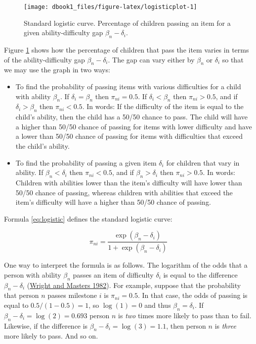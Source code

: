 \documentclass[
]{book}
\providecommand{\tightlist}{%
  \setlength{\itemsep}{0pt}\setlength{\parskip}{0pt}}
\begin{document}
\begin{figure}

{\centering \texttt{[image: dbook1\_files/figure-latex/logisticplot-1]} 

}

\caption{Standard logistic curve. Percentage of children passing an item for a given ability-difficulty gap \(\beta_n - \delta_i\).}\label{fig:logisticplot}
\end{figure}



Figure \ref{fig:logisticplot} shows how the percentage of children that pass the item varies in terms of the ability-difficulty gap \(\beta_n - \delta_i\). The gap can vary either by \(\beta_n\) or \(\delta_i\) so that we may use the graph in two ways:

\begin{itemize}
\tightlist
\item
  To find the probability of passing items with various difficulties for a child with ability \(\beta_n\). If \(\delta_i = \beta_n\) then \(\pi_{ni} = 0.5\). If \(\delta_i < \beta_n\) then \(\pi_{ni} > 0.5\), and if \(\delta_i > \beta_n\) then \(\pi_{ni} < 0.5\). In words: If the difficulty of the item is equal to the child's ability, then the child has a 50/50 chance to pass. The child will have a higher than 50/50 chance of passing for items with lower difficulty and have a lower than 50/50 chance of passing for items with difficulties that exceed the child's ability.
\item
  To find the probability of passing a given item \(\delta_i\) for children that vary in ability. If \(\beta_n < \delta_i\) then \(\pi_{ni} < 0.5\), and if \(\beta_n > \delta_i\) then \(\pi_{ni} > 0.5\). In words: Children with abilities lower than the item's difficulty will have lower than 50/50 chance of passing, whereas children with abilities that exceed the item's difficulty will have a higher than 50/50 chance of passing.
\end{itemize}

Formula \eqref{eq:logistic} defines the standard logistic curve:

\begin{equation}
\pi_{ni} = \frac{\exp(\beta_n - \delta_i)}{1+\exp(\beta_n -\delta_i)} \label{eq:logistic}
\end{equation}

One way to interpret the formula is as follows. The logarithm of the odds that a person with ability \(\beta_n\) passes an item of difficulty \(\delta_i\) is equal to the difference \(\beta_n-\delta_i\) (\protect\hyperlink{ref-wright1982}{Wright and Masters 1982}). For example, suppose that the probability that person \(n\) passes milestone \(i\) is \(\pi_{ni} = 0.5\). In that case, the odds of passing is equal to \(0.5 / (1-0.5) = 1\), so \(\log(1) = 0\) and thus \(\beta_n = \delta_i\). If \(\beta_n - \delta_i = \log(2) = 0.693\) person \(n\) is \emph{two} times more likely to pass than to fail. Likewise, if the difference is \(\beta_n - \delta_i = \log(3) = 1.1\), then person \(n\) is \emph{three} more likely to pass. And so on.
\end{document}
